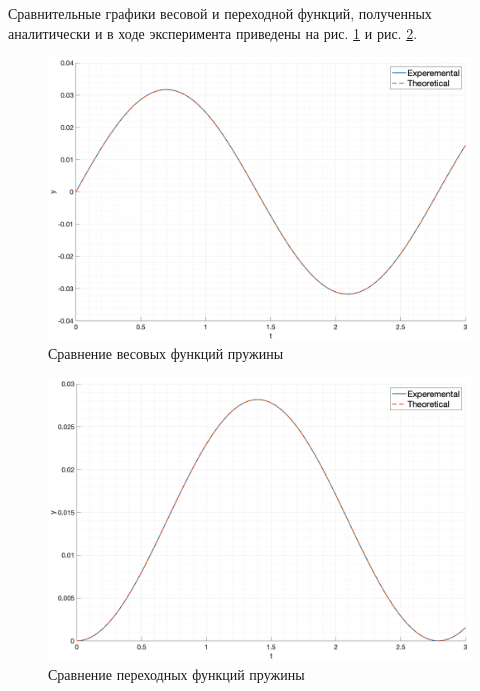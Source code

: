Сравнительные графики весовой и переходной функций, полученных аналитически и в ходе эксперимента  приведены на рис. \ref{fig:task4_impulse_response_cmp} и рис. \ref{fig:task4_step_response_cmp}.
\begin{figure}[ht!]
    \centering
    \includegraphics[width=\textwidth]{media/plots/task4_impulse_response_cmp.png}
    \caption{Сравнение весовых функций пружины}
    \label{fig:task4_impulse_response_cmp}
\end{figure}
\begin{figure}[ht!]
    \centering
    \includegraphics[width=\textwidth]{media/plots/task4_step_response_cmp.png}
    \caption{Сравнение переходных функций пружины}
    \label{fig:task4_step_response_cmp}
\end{figure}

\FloatBarrier
